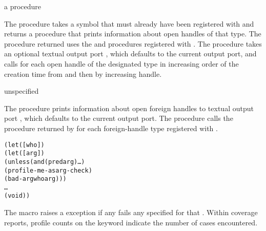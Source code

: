 \begin{procedure}
\end{procedure}
\returns{} a procedure

The  procedure takes a symbol  that
must already have been registered with  and
returns a procedure that prints information about open handles of that type.
The procedure returned uses the  and 
procedures registered with .
The procedure takes an optional textual output port , which defaults
to the current output port, and calls  for each open handle of the
designated type in increasing order of the creation time from 
and then by increasing handle.

\begin{procedure}
\end{procedure}
\returns{} unspecified

The  procedure prints information about open
foreign handles to textual output port , which defaults to the current
output port.
The  procedure
calls the procedure returned by 
for each foreign-handle type registered with .

\begin{syntax}
\end{syntax}
\expandsto{}\begin{alltt}\antipar
(let ([who ])
  (let ([arg ])
    (unless (and (pred arg) \ldots)
      (profile-me-as arg-check)
      (bad-arg who arg)))
  \ldots
  (void))\end{alltt}

The  macro raises a  exception if
any  fails any  specified for that .
Within coverage reports, profile counts on the 
keyword indicate the number of  cases encountered.

